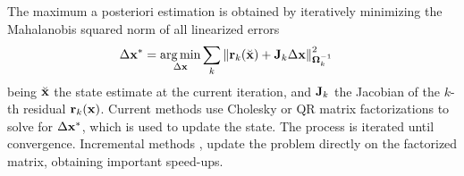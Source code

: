 The maximum a posteriori estimation is obtained by iteratively minimizing the Mahalanobis squared norm of all linearized errors
%
\begin{align}
  \Delta {\bf x}^* &= \operatorname*{arg\,min}_{\Delta {\bf x}} \sum_k {\left\| {\bf r}_k(\breve{{\bf x}}) + {\bf J}_k \Delta {\bf x} \right\|}_{{\bm \Omega}_k^{-1}}^2 \label{eq:LeastSquares}
\end{align}
%
being $\breve{{\bf x}}$ the state estimate at the current iteration, and ${\bf J}_k$ the Jacobian of the $k$-th residual ${\bf r}_k({\bf x})$.
%
Current methods use Cholesky \cite{Kummerle_icra11,ila_ijrr17} or QR  \cite{Dellaert_ijrr06,Kaess_ijrr11} matrix factorizations to solve for $\Delta{\bf x}^*$, which is used to update the state. 
The process is iterated until convergence.
%
Incremental methods \cite{ila_ijrr17,Kaess_ijrr11}, update the problem directly on the factorized matrix, obtaining important speed-ups.





